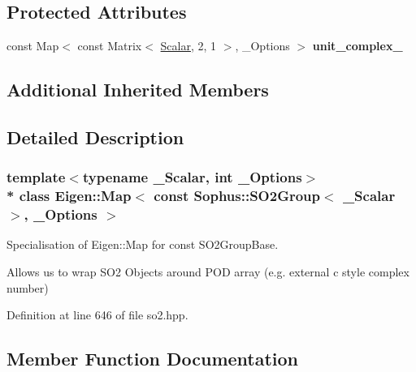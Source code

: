 \subsection*{Protected Attributes}
\begin{DoxyCompactItemize}
\item 
const Map$<$ const Matrix$<$ \hyperlink{class_eigen_1_1_map_3_01const_01_sophus_1_1_s_o2_group_3_01___scalar_01_4_00_01___options_01_4_a437464266d5d506a72bca93371ba33f1}{Scalar}, 2, 1 $>$, \+\_\+\+Options $>$ {\bfseries unit\+\_\+complex\+\_\+}\hypertarget{class_eigen_1_1_map_3_01const_01_sophus_1_1_s_o2_group_3_01___scalar_01_4_00_01___options_01_4_a0b3c442abbf51b6271fe44655c41fc1c}{}\label{class_eigen_1_1_map_3_01const_01_sophus_1_1_s_o2_group_3_01___scalar_01_4_00_01___options_01_4_a0b3c442abbf51b6271fe44655c41fc1c}

\end{DoxyCompactItemize}
\subsection*{Additional Inherited Members}


\subsection{Detailed Description}
\subsubsection*{template$<$typename \+\_\+\+Scalar, int \+\_\+\+Options$>$\\*
class Eigen\+::\+Map$<$ const Sophus\+::\+S\+O2\+Group$<$ \+\_\+\+Scalar $>$, \+\_\+\+Options $>$}

Specialisation of Eigen\+::\+Map for const S\+O2\+Group\+Base. 

Allows us to wrap S\+O2 Objects around P\+OD array (e.\+g. external c style complex number) 

Definition at line 646 of file so2.\+hpp.



\subsection{Member Function Documentation}
